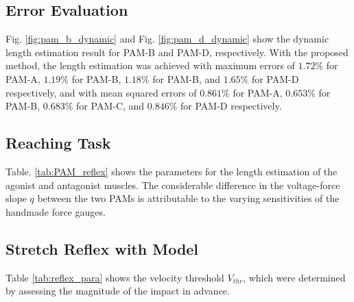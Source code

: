 \vspace{1cm}

\subsection{Error Evaluation} 
Fig. \ref{fig:pam_b_dynamic} and Fig. \ref{fig:pam_d_dynamic} show the dynamic length estimation result for PAM-B and PAM-D, respectively.
With the proposed method, the length estimation was achieved with maximum errors of $1.72\%$ for PAM-A, $1.19\%$ for PAM-B, $1.18\%$ for PAM-B, and  $1.65\%$ for PAM-D respectively, and with mean squared errors of $0.861\%$ for PAM-A, $0.653\%$ for PAM-B, $0.683\%$ for PAM-C, and $0.846\%$ for PAM-D respectively.

\subsection{Reaching Task}
Table. \ref{tab:PAM_reflex} shows the parameters for the length estimation of the agonist and antagonist muscles. The considerable difference in the voltage-force slope $q$  between the two PAMs is attributable to the varying sensitivities of the handmade force gauges.

\begin{table}[H]
    \centering
    \caption{Parameters for Length Estimation} 
    \label{tab:PAM_reflex}
\end{table}


\subsection{Stretch Reflex with Model}
Table \ref{tab:reflex_para} shows the velocity threshold $V_{thr}$, which were determined by assessing the magnitude of the impact in advance. 

